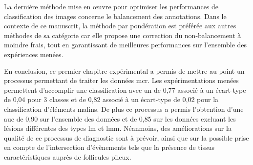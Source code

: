 La dernière méthode mise en œuvre pour optimiser les performances de classification des images concerne le balancement des annotations. Dans le contexte de ce manuscrit, la méthode par pondération est préférée aux autres méthodes de sa catégorie car elle propose une correction du non-balancement à moindre frais, tout en garantissant de meilleures performances sur l'ensemble des expériences menées.\par

En conclusion, ce premier chapitre expérimental a permis de mettre au point un processus permettant de traiter les données \gls{mcr}. Les expérimentations menées permettent d'accomplir une classification avec un \fscore{} de 0,77 associé à un écart-type de 0,04 pour 3 classes et de 0,82 associé à un écart-type de 0,02 pour la classification d'éléments malins. De plus ce processus a permis l'obtention d'une \gls{auc} de 0,90 sur l'ensemble des données et de 0,85 sur les données excluant les lésions différentes des types \gls{lm} et \gls{lmm}. Néanmoins, des améliorations sur la qualité de ce processus de diagnostic sont à prévoir, ainsi que sur la possible prise en compte de l'intersection d'évènements tels que la présence de tissus caractéristiques auprès de follicules pileux.\par